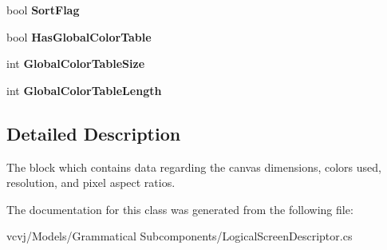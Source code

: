 \begin{DoxyCompactItemize}
\item 
bool {\bfseries Sort\+Flag}\hypertarget{classvcvj_1_1_models_1_1_grammatical___subcomponents_1_1_logical_screen_descriptor_aa944c12cb8d8709e79dd1ac81e4f03da}{}\label{classvcvj_1_1_models_1_1_grammatical___subcomponents_1_1_logical_screen_descriptor_aa944c12cb8d8709e79dd1ac81e4f03da}

\item 
bool {\bfseries Has\+Global\+Color\+Table}\hypertarget{classvcvj_1_1_models_1_1_grammatical___subcomponents_1_1_logical_screen_descriptor_a19df8fe996380b8d64909615efc420a0}{}\label{classvcvj_1_1_models_1_1_grammatical___subcomponents_1_1_logical_screen_descriptor_a19df8fe996380b8d64909615efc420a0}

\item 
int {\bfseries Global\+Color\+Table\+Size}\hypertarget{classvcvj_1_1_models_1_1_grammatical___subcomponents_1_1_logical_screen_descriptor_a7d4bf15cab57a46e1ba586edea1cf70b}{}\label{classvcvj_1_1_models_1_1_grammatical___subcomponents_1_1_logical_screen_descriptor_a7d4bf15cab57a46e1ba586edea1cf70b}

\item 
int {\bfseries Global\+Color\+Table\+Length}\hypertarget{classvcvj_1_1_models_1_1_grammatical___subcomponents_1_1_logical_screen_descriptor_abbb6e91992e8f02f4c9d0268b41eb5ef}{}\label{classvcvj_1_1_models_1_1_grammatical___subcomponents_1_1_logical_screen_descriptor_abbb6e91992e8f02f4c9d0268b41eb5ef}

\end{DoxyCompactItemize}


\subsection{Detailed Description}
The block which contains data regarding the canvas dimensions, colors used, resolution, and pixel aspect ratios. 



The documentation for this class was generated from the following file\+:\begin{DoxyCompactItemize}
\item 
vcvj/\+Models/\+Grammatical Subcomponents/Logical\+Screen\+Descriptor.\+cs\end{DoxyCompactItemize}
